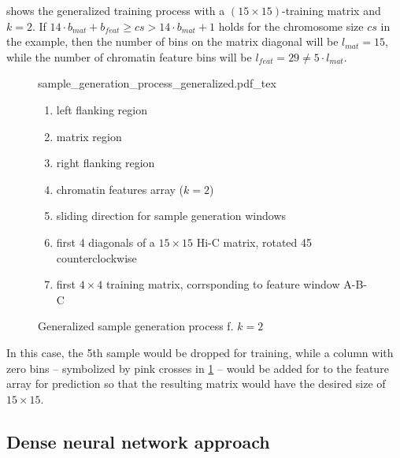 shows the generalized training process with a $(15\times15)$-training matrix and $k=2$. 
If $14\cdot b_{mat} + b_{feat} \geq cs > 14\cdot b_{mat} + 1$ holds for the chromosome size $cs$ in the example,
then the number of bins on the matrix diagonal will be $l_{mat}=15$, while the number of chromatin feature bins will be $l_{feat}=29 \not = 5 \cdot l_{mat}$.
\begin{figure}
 \begin{minipage}{0.60\textwidth}
   \centering
    \small
    {sample_generation_process_generalized.pdf_tex}
    \caption{Generalized sample generation process f. $k=2$}
    \label{fig:methods:sample_gen_generalized}
 \end{minipage}\hfill
 \begin{minipage}{0.3\textwidth}
 \scriptsize
  \begin{enumerate}[label=\Alph*:,leftmargin=*]
   \raggedright
    \item left flanking region
    \item matrix region
    \item right flanking region
    \item chromatin features array ($k=2$)
    \item sliding direction for sample generation windows
    \item first 4 diagonals of a $15\times15$ Hi-C matrix, rotated \SI{45}{\deg} counterclockwise
    \item first $4\times4$ training matrix, corrsponding to feature window A-B-C
\end{enumerate}
 \end{minipage}
\end{figure}
In this case, the 5th sample would be dropped for training,
while a column with zero bins -- symbolized by pink crosses in \cref{fig:methods:sample_gen_generalized} -- would be added for to the feature array for prediction
so that the resulting matrix would have the desired size of $15 \times 15$.




\subsection{Dense neural network approach}

